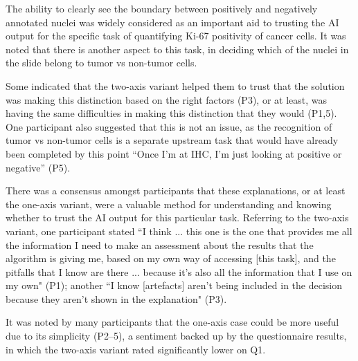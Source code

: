 The ability to clearly see the boundary between positively and negatively annotated nuclei was widely considered as an important aid to trusting the AI output for the specific task of quantifying Ki-67 positivity of cancer cells. It was noted that there is another aspect to this task, in deciding which of the nuclei in the slide belong to tumor vs non-tumor cells. 

Some indicated that the two-axis variant helped them to trust that the solution was making this distinction based on the right factors (P3), or at least, was having the same difficulties in making this distinction that they would (P1,5). One participant also suggested that this is not an issue, as the recognition of tumor vs non-tumor cells is a separate upstream task that would have already been completed by this point “Once I’m at IHC, I’m just looking at positive or negative” (P5).


There was a consensus amongst participants that these explanations, or at least the one-axis variant, were a valuable method for understanding and knowing whether to trust the AI output for this particular task. Referring to the two-axis variant, one participant stated “I think ... this one is the one that provides me all the information I need to make an assessment about the results that the algorithm is giving me, based on my own way of accessing [this task], and the pitfalls that I know are there ... because it's also all the information that I use on my own" (P1); another ``I know [artefacts] aren’t being included in the decision because they aren’t shown in the explanation" (P3). 

It was noted by many participants that the one-axis case could be more useful due to its simplicity (P2--5), a sentiment backed up by the questionnaire results, in which the two-axis variant rated significantly lower on Q1.


